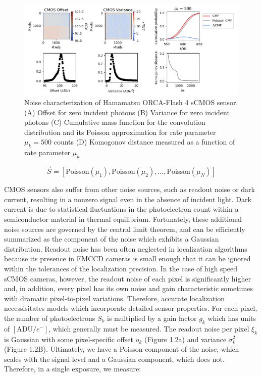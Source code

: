 \documentclass{ucetd}
\begin{document}
\begin{figure}
\begin{center}
\includegraphics[width=16cm]{Noise.png}
\end{center}
\caption{Noise characterization of Hamamatsu ORCA-Flash 4 sCMOS sensor. (A) Offset for zero incident photons (B) Variance for zero incident photons (C) Cumulative mass function for the convolution distribution and its Poisson approximation for rate parameter $\mu_{k} = 500$ counts (D) Komogonov distance measured as a function of rate parameter $\mu_{k}$}
\end{figure}


\begin{equation}
\vec{S} = \left[\mathrm{Poisson}(\mu_{1}), \mathrm{Poisson}(\mu_{2}), ..., \mathrm{Poisson}(\mu_{N})\right]
\end{equation}

CMOS sensors also suffer from other noise sources, such as readout noise or dark current, resulting in a nonzero signal even in the absence of incident light. Dark current is due to statistical fluctuations in the photoelectron count within a semiconductor material in thermal equilibrium. Fortunately, these additional noise sources are governed by the central limit theorem, and can be efficiently summarized as the component of the noise which exhibits a Gaussian distribution. Readout noise has been often neglected in localization algorithms because its presence in EMCCD cameras is small enough that it can be ignored within the tolerances of the localization precision. In the case of high speed sCMOS cameras, however, the readout noise of each pixel is significantly higher and, in addition, every pixel has its own noise and gain characteristic sometimes with dramatic pixel-to-pixel variations. Therefore, accurate localization necessisitates models which incorporate detailed sensor properties. For each pixel, the number of photoelectrons $S_{k}$ is  multiplied by a gain factor $g_{k}$ which has units of $[\mathrm{ADU}/e^{-}]$, which generally must be measured. The readout noise per pixel $\xi_{k}$ is Gaussian with some pixel-specific offset $o_{k}$ (Figure 1.2a) and variance $\sigma_{k}^{2}$ (Figure 1.2B). Ultimately, we have a Poisson component of the noise, which scales with the signal level and a Gaussian component, which does not. Therefore, in a single exposure, we measure: 
\end{document}
